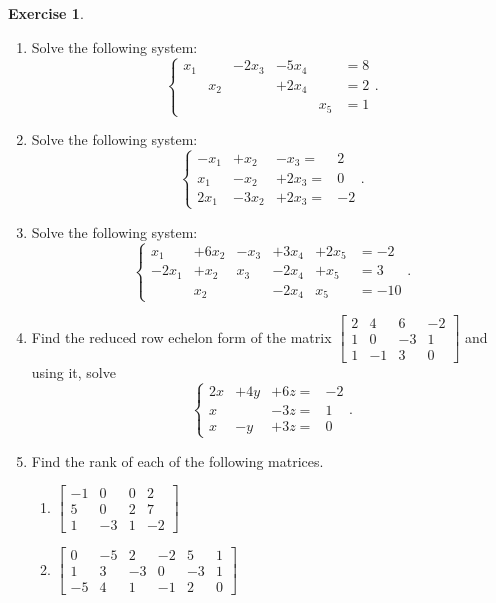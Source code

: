 \documentclass[12pt,letterpaper]{book}
\numberwithin{equation}{section}
\theoremstyle{definition}
\newtheorem{exercise}{\textbf{Exercise}}[chapter]
\begin{document}
\begin{exercise}\quad
\begin{enumerate}[\bfseries 1.]

\item Solve the following system:
$$\left\{\begin{array}{rrrrrr}
x_1& &-2x_3 &-5x_4& &=8 \\
 &x_2& &+2x_4& &=2 \\
& & & &x_5&=1
 \end{array}\right. .$$

\item Solve the following system:
$$\left\{\begin{array}{rrrr}
-x_1&+x_2&-x_3=&2
\\ x_1&-x_2 &+2x_3=&0 \\ 2x_1&-3x_2&+2x_3=&-2 \end{array}\right. .$$

\item Solve the following system:
$$\left\{\begin{array}{rrrrrr}
x_1&+6x_2&-x_3&+3x_4&+2x_5&=-2 \\
-2x_1&+x_2&x_3&-2x_4&+x_5&=3 \\&x_2&&-2x_4&x_5&=-10
 \end{array}\right. .$$

\item Find the reduced row echelon form of the matrix $\left[\begin{array}{rrrr}
2 & 4 & 6 & -2 \\ 1 & 0 & -3 & 1
\\ 1 & -1 & 3 & 0 \end{array}\right]$ and using it, solve
$$\left\{\begin{array}{rrrr}
2x&+4y&+6z=&-2
\\ x&&-3z=&1 \\ x&-y&+3z=&0 \end{array}\right..$$

\item Find the rank of each of the following matrices.
\begin{multicols}{2}
\begin{enumerate}
\item $\left[\begin{array}{rrrr}
-1 & 0 & 0 & 2 \\ 5 & 0 & 2 & 7
\\ 1 & -3 & 1 & -2 \end{array}\right]$
\item $\left[\begin{array}{rrrrrr}
0 & -5 & 2 & -2 & 5 & 1\\ 1 & 3 & -3 & 0 & -3 & 1
\\ -5 & 4 & 1 & -1 & 2& 0 \end{array}\right]$
\end{enumerate}
\end{multicols}

\end{enumerate}
\end{exercise}
\end{document}
